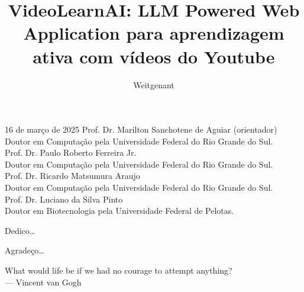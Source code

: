 \documentclass[tcc,capa]{texufpel}
\title{VideoLearnAI: LLM Powered Web Application para aprendizagem ativa com vídeos do Youtube}
\author{Weitgenant}{Kevin Castro}
\begin{document}

\maketitle 

\sloppy

\fichacatalografica


\begin{aprovacao}{16 de março de 2025} %
\noindent Prof. Dr. Marilton Sanchotene de Aguiar (orientador)\\
Doutor em Computação pela Universidade Federal do Rio Grande do Sul.\\[1cm]

\noindent Prof. Dr. Paulo Roberto Ferreira Jr.\\
Doutor em Computação pela Universidade Federal do Rio Grande do Sul.\\[1cm]

\noindent Prof. Dr. Ricardo Matsumura Araujo\\
Doutor em Computação pela Universidade Federal do Rio Grande do Sul.\\[1cm]

\noindent Prof. Dr. Luciano da Silva Pinto\\
Doutor em Biotecnologia pela Universidade Federal de Pelotas.
\end{aprovacao}

\begin{dedicatoria}
  Dedico\ldots 
\end{dedicatoria}

\begin{agradecimentos}
  Agradeço\ldots 
\end{agradecimentos}

\begin{epigrafe}
  What would life be if we had no courage to attempt anything?\\
  {\sc --- Vincent van Gogh}
\end{epigrafe}
\end{document}
